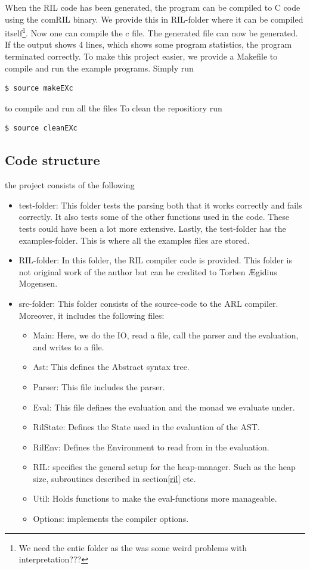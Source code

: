 \documentclass[a4paper]{article}
\begin{document}
When the RIL code has been generated, the program can be compiled to C code using the comRIL binary. We provide this in RIL-folder where it can be compiled itself\footnote{We need the entie folder as the was some weird problems with interpretation???}. Now one can compile the c file. The generated file can now be generated. If the output shows 4 lines, which shows some program statistics, the program terminated correctly. To make this project easier, we provide a Makefile to compile and run the example programs. Simply run
\begin{verbatim}
$ source makeEXc
\end{verbatim}
to compile and run all the files
To clean the repositiory run
\begin{verbatim}
$ source cleanEXc
\end{verbatim}
\subsection{Code structure}
\label{sec:org70ad947}
the project consists of the following
\begin{itemize}
\item test-folder: This folder tests the parsing both that it works correctly and fails correctly. It also tests some of the other functions used in the code. These tests could have been a lot more extensive. Lastly, the test-folder has the examples-folder. This is where all the examples files are stored.
\item RIL-folder: In this folder, the RIL compiler code is provided. This folder is not original work of the author but can be credited to Torben Ægidius Mogensen.
\item src-folder: This folder consists of the source-code to the ARL compiler. Moreover, it includes the following files:
\begin{itemize}
\item Main: Here, we do the IO, read a file, call the parser and the evaluation, and writes to a file.
\item Ast: This defines the Abstract syntax tree.
\item Parser: This file includes the parser.
\item Eval: This file defines the evaluation and the monad we evaluate under.
\item RilState: Defines the State used in the evaluation of the AST.
\item RilEnv:  Defines the Environment to read from in the evaluation.
\item RIL: specifies the general setup for the heap-manager. Such as the heap size, subroutines described in section\ref{ril} etc.
\item Util: Holds functions to make the eval-functions more manageable.
\item Options: implements the compiler options.
\end{itemize}
\end{itemize}
\end{document}
